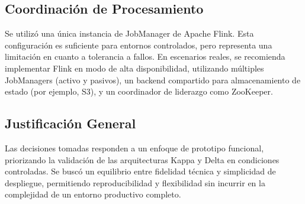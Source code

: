 \subsection{Coordinación de Procesamiento}
Se utilizó una única instancia de JobManager de Apache Flink. Esta configuración es suficiente para entornos controlados, pero representa una limitación en cuanto a tolerancia a fallos. 
En escenarios reales, se recomienda implementar Flink en modo de alta disponibilidad, utilizando múltiples JobManagers (activo y pasivos), 
un backend compartido para almacenamiento de estado (por ejemplo, S3), 
y un coordinador de liderazgo como ZooKeeper.

\subsection{Justificación General}
Las decisiones tomadas responden a un enfoque de prototipo funcional, priorizando la validación de las arquitecturas Kappa y Delta en condiciones controladas. 
Se buscó un equilibrio entre fidelidad técnica y simplicidad de despliegue, permitiendo reproducibilidad y flexibilidad sin incurrir en la complejidad de un entorno productivo completo.
